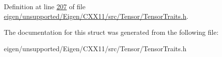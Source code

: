 Definition at line \hyperlink{eigen_2unsupported_2_eigen_2_c_x_x11_2src_2_tensor_2_tensor_traits_8h_source_l00207}{207} of file \hyperlink{eigen_2unsupported_2_eigen_2_c_x_x11_2src_2_tensor_2_tensor_traits_8h_source}{eigen/unsupported/\+Eigen/\+C\+X\+X11/src/\+Tensor/\+Tensor\+Traits.\+h}.



The documentation for this struct was generated from the following file\+:\begin{DoxyCompactItemize}
\item 
eigen/unsupported/\+Eigen/\+C\+X\+X11/src/\+Tensor/\+Tensor\+Traits.\+h\end{DoxyCompactItemize}
